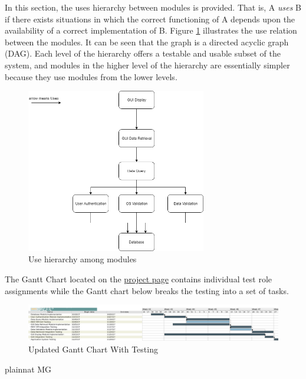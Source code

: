 \documentclass[12pt, titlepage]{article}
\begin{document}
In this section, the uses hierarchy between modules is
provided. That is, A {\em uses} B if there exists situations in which
the correct functioning of A depends upon the availability of a correct
implementation of B.  Figure \ref{FigUH} illustrates the use relation between
the modules. It can be seen that the graph is a directed acyclic graph
(DAG). Each level of the hierarchy offers a testable and usable subset of the
system, and modules in the higher level of the hierarchy are essentially simpler
because they use modules from the lower levels.

\begin{figure}[H]
\centering
\includegraphics[width=0.7\textwidth]{group33_module_heirarchy.png}
\caption{Use hierarchy among modules}
\label{FigUH}
\end{figure}

The Gantt Chart located on the \href{https://gitlab.cas.mcmaster.ca/coitn/se3xa3-fall2017/blob/5f395a201142607bc7222f5af2450baca2cb0a42/Doc/DevelopmentPlan/group33-project-schedule.pdf}{project page} contains individual test role assignments while the Gantt chart below breaks the testing into a set of tasks.
\begin{figure}[H]
\centering
\includegraphics[width=1.0\textwidth]{Group33_SIMS_project_breakdown.png}
\caption{Updated Gantt Chart With Testing}
\label{FigUI}
\end{figure}

 {plainnat}
 {MG}
\end{document}
